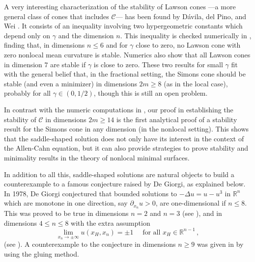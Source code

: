\documentclass[12pt,reqno]{amsart}
\theoremstyle{definition}
\theoremstyle{remark}
\newcommand{\con}[1]{\mathbb{#1}}
\newcommand{\R}{\con{R}} %
\newcommand{\ccal}{\mathscr{C}}
\newcommand{\s}{\gamma}
\numberwithin{equation}{section}
\begin{document}
A very interesting characterization of the stability of Lawson cones ---a more general class of cones that includes $\ccal$--- has been found by Dávila, del Pino, and Wei \cite{DaviladelPinoWei}. It consists of an inequality involving  two hypergeometric constants which depend only on $\s$ and the dimension $n$. This inequality is checked numerically in \cite{DaviladelPinoWei}, finding that, in dimensions $n \leq 6$ and for $\s$ close to zero, no Lawson cone with zero nonlocal mean curvature is stable. Numerics also show that all Lawson cones in dimension $7$ are stable if $\s$ is close to zero. These two results for small $\s$ fit with the general belief that, in the fractional setting, the Simons cone should be stable (and even a minimizer) in dimensions $2m \geq 8$ (as in the local case), probably for all $\s\in(0,1/2)$, though this is still an open problem. 

In contrast with the numeric computations in \cite{DaviladelPinoWei}, our proof in \cite{Felipe-Sanz-Perela:SaddleFractional} establishing the stability of $\ccal$ in dimensions $2m \geq 14$ is the first analytical proof of a stability result for the Simons cone in any dimension (in the nonlocal setting). This shows that the saddle-shaped solution does not only have its interest in the context of the Allen-Cahn equation, but it can also provide strategies to prove stability and minimality results in the theory of nonlocal minimal surfaces.



In addition to all this, saddle-shaped solutions are natural objects to build a counterexample to a famous conjecture raised by De Giorgi, as explained below. In 1978, De Giorgi \cite{DeGiorgi1979Conjecture} conjectured that bounded solutions to $-\Delta  u = u - u^3$ in $\R^n$ which are monotone in one direction, say $\partial_{x_n} u > 0$, are one-dimensional if $n\leq8$. This was proved to be true in dimensions $n=2$ and $n=3$ (see \cite{GhoussoubGui,AmbrosioCabre}), and in dimensions $4\leq n \leq 8$ with the extra assumption
\begin{equation}
\label{Eq:SavinCondition}
\lim_{x_n \to \pm \infty} u(x_H,x_n) = \pm 1 \quad \text{ for all } x_H\in \R^{n-1}\,,
\end{equation}
(see \cite{Savin-DeGiorgi}). A counterexample to the conjecture in dimensions $n\geq 9$ was given in \cite{delPinoKowalczykWei} by using the gluing method. 
\end{document}
